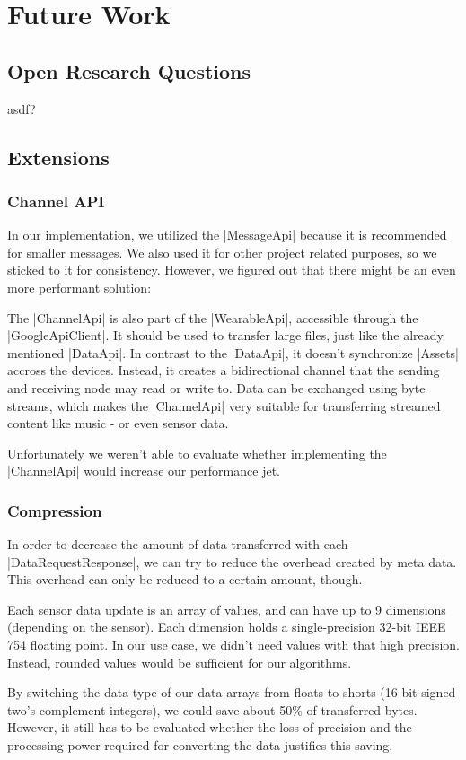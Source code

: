 \section{Future Work}
\label{sec:futurework}

\subsection{Open Research Questions}
asdf?

\subsection{Extensions}

\subsubsection{Channel API}
In our implementation, we utilized the |MessageApi|\cite{androiddocs:messageapi} because it is recommended for smaller messages.
We also used it for other project related purposes, so we sticked to it for consistency.
However, we figured out that there might be an even more performant solution:

The |ChannelApi|\cite{androiddocs:channelapi} is also part of the |WearableApi|\cite{androiddocs:wearable}, accessible through the |GoogleApiClient|\cite{androiddocs:googleapiclient}.
It should be used to transfer large files, just like the already mentioned |DataApi|\cite{androiddocs:dataapi}.
In contrast to the |DataApi|, it doesn't synchronize |Assets|\cite{androiddocs:asset} accross the devices.
Instead, it creates a bidirectional channel that the sending and receiving node may read or write to.
Data can be exchanged using byte streams, which makes the |ChannelApi| very suitable for transferring streamed content like music - or even sensor data.

Unfortunately we weren't able to evaluate whether implementing the |ChannelApi| would increase our performance jet.

\subsubsection{Compression}
In order to decrease the amount of data transferred with each |DataRequestResponse|\cite{sensordatalogger:datarequestresponse}, we can try to reduce the overhead created by meta data.
This overhead can only be reduced to a certain amount, though.

Each sensor data update is an array of values, and can have up to 9 dimensions (depending on the sensor).
Each dimension holds a single-precision 32-bit IEEE 754 floating point.
In our use case, we didn't need values with that high precision.
Instead, rounded values would be sufficient for our algorithms.

By switching the data type of our data arrays from floats to shorts (16-bit signed two's complement integers), we could save about 50\% of transferred bytes. However, it still has to be evaluated whether the loss of precision and the processing power required for converting the data justifies this saving.

\clearpage
